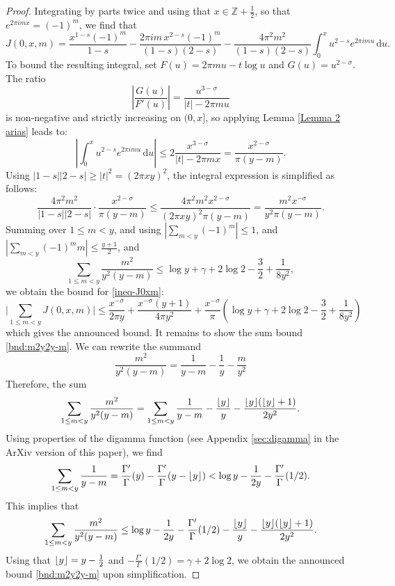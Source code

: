\documentclass[11pt,letterpaper,oneside,reqno]{amsart}
\DeclarePairedDelimiter\floor{\lfloor}{\rfloor}
\renewcommand{\^}[1]{\widehat{#1}}
\newcommand{\Z}{{\mathbb{Z}}}
\numberwithin{equation}{section}
\theoremstyle{remark}
\begin{document}
%
\begin{proof}
Integrating by parts twice and using that $x \in \Z+\frac{1}{2}$, so that $e^{2\pi i mx}=(-1)^m$,  we find that
\begin{equation}\label{ineq-J0xm}
        J(0,x,m) 
        = \frac{x^{1-s} (-1)^m}{1-s} - \frac{2\pi i m \, x^{2-s} (-1)^m}{(1-s)(2-s)} - \frac{4\pi^2 m^2}{(1-s)(2-s)} \int_0^x u^{2-s} e^{2\pi i m u} \,\mathrm{d}u.
\end{equation}
To bound the resulting integral, set $F(u)= 2\pi m u - t\log u$ and $G(u)=u^{2-\sigma}$. The ratio
\[
\left|\frac{G(u)}{F'(u)}\right| = \frac{u^{3-\sigma}}{|t|-2\pi m u}
\]
is non-negative and strictly increasing on $(0, x]$, so applying Lemma \ref{Lemma 2 arias} leads to:
\[
\left| \int_0^x u^{2-s} e^{2\pi i m u} \,\mathrm{d}u \right| 
\le 2 \frac{x^{3-\sigma}}{|t|-2\pi m x} 
%
= \frac{x^{2-\sigma}}{\pi(y - m)}.
\]
Using $|1-s||2-s| \ge |t|^2 = (2\pi x y)^2$, the integral expression is simplified as follows:
\[
\frac{4\pi^2 m^2}{|1-s||2-s|} \cdot \frac{x^{2-\sigma}}{\pi(y-m)} \le \frac{4\pi^2 m^2 x^{2-\sigma}}{(2\pi x y)^2 \pi (y-m)} 
%
= \frac{ m^2 x^{-\sigma} }{ y^2 \pi (y-m)} .
\]
Summing over $1 \le m < y$, and using
$\left|\sum_{m < y} (-1)^m\right| \le 1$, and $\left|\sum_{m < y} (-1)^m m\right| \le \frac{y+1}{2}$, and
\begin{equation}\label{bnd:m2y2y-m}
    \sum_{1 \leq m < y } \frac{m^2}{y^2(y- m) } \le  \log y 
+\gamma +2\log 2
- \frac{3}{2}
+ \frac{1}{8y^2},
\end{equation}
we obtain the bound for \eqref{ineq-J0xm}:
%
\[    \bigg|\sum_{1 \leq m < y }J(0,x,m)\bigg| 
    \le \frac{x^{-\sigma}}{2\pi  y} 
+ \frac{ x^{-\sigma}(y+1)}{4\pi y^2} 
+ \frac{ x^{-\sigma} }{ \pi } \left(  \log y  +\gamma +2\log 2
- \frac{3}{2}
+ \frac{1}{8y^2} \right) 
%
\]
which gives the announced bound. It remains to show the sum bound \eqref{bnd:m2y2y-m}. 
We can rewrite the summand 
\[ \frac{m^2}{y^2(y- m) }=\frac{1}{y-m}-\frac{1}{y}-\frac{m}{y^2} \] 
Therefore, the sum
\[\sum_{1 \leq m < y } \frac{m^2}{y^2(y- m) }= \sum_{1 \leq m < y }\frac{1}{y-m}-\frac{\floor{y}}{y}-\frac{\floor{y}(\floor{y}+1)}{2y^2}.
\]
%
Using properties of the digamma function (see Appendix \ref{sec:digamma} in the ArXiv version of this paper), we find 
\[
\sum_{1 \leq m < y }\frac{1}{y-m} 
= \frac{\Gamma'}{\Gamma}(y)-\frac{\Gamma'}{\Gamma}(y-\floor{y})
<
\log y -\frac1{2y} -\frac{\Gamma'}{\Gamma}(1/2).
\]
This implies that 
\begin{equation*}
    \sum_{1 \leq m < y } \frac{m^2}{y^2(y- m) }
\le
\log y -\frac1{2y} -\frac{\Gamma'}{\Gamma}(1/2)
- \frac{\floor{y}}{y}
- \frac{\floor{y}(\floor{y}+1)}{2y^2}.
\end{equation*}
Using that $\floor{y}=y-\frac{1}{2}$ and $-\frac{\Gamma'}{\Gamma}(1/2) = \gamma+2\log 2$, we obtain the announced bound \eqref{bnd:m2y2y-m} upon simplification.
%
\smallskip 


\end{proof}
\end{document}
